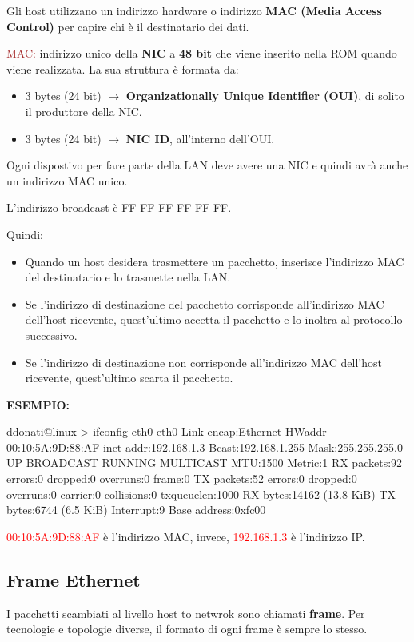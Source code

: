 Gli host utilizzano un indirizzo hardware o indirizzo \textbf{MAC (Media Access Control)} per capire chi è il destinatario dei dati.

\begin{boxDef}
\textcolor{brown}{MAC:} indirizzo unico della \textbf{NIC} a \textbf{48 bit} che viene inserito nella ROM quando viene realizzata. La sua struttura è formata da:
\begin{itemize}
    \item 3 bytes (24 bit) $\rightarrow$ \textbf{Organizationally Unique Identifier (OUI)}, di solito il produttore della NIC.
    \item 3 bytes (24 bit) $\rightarrow$ \textbf{NIC ID}, all'interno dell'OUI.
\end{itemize}
Ogni dispostivo per fare parte della LAN deve avere una NIC e quindi avrà anche un indirizzo MAC unico.
\end{boxDef}

L'indirizzo broadcast è FF-FF-FF-FF-FF-FF.

\newpage
Quindi:
\begin{itemize}
    \item Quando un host desidera trasmettere un pacchetto, inserisce l'indirizzo MAC del destinatario e lo trasmette nella LAN.
    \item Se l'indirizzo di destinazione del pacchetto corrisponde all'indirizzo MAC dell'host ricevente, quest'ultimo accetta il pacchetto e lo inoltra al protocollo successivo.
    \item Se l'indirizzo di destinazione non corrisponde all'indirizzo MAC dell'host ricevente, quest'ultimo scarta il pacchetto.
\end{itemize}

\vspace*{0.02\textheight}
\textbf{ESEMPIO:}
\begin{bashbox}
ddonati@linux > ifconfig eth0
eth0 Link encap:Ethernet HWaddr 00:10:5A:9D:88:AF
inet addr:192.168.1.3 Bcast:192.168.1.255 Mask:255.255.255.0
UP BROADCAST RUNNING MULTICAST MTU:1500 Metric:1
RX packets:92 errors:0 dropped:0 overruns:0 frame:0
TX packets:52 errors:0 dropped:0 overruns:0 carrier:0
collisions:0 txqueuelen:1000
RX bytes:14162 (13.8 KiB) TX bytes:6744 (6.5 KiB)
Interrupt:9 Base address:0xfc00
\end{bashbox}

\textcolor{red}{00:10:5A:9D:88:AF} è l'indirizzo MAC, invece, \textcolor{red}{192.168.1.3} è l'indirizzo IP.

\subsection{Frame Ethernet}
I pacchetti scambiati al livello host to netwrok sono chiamati \textbf{frame}. Per tecnologie e topologie diverse, il formato di ogni frame è sempre lo stesso.

